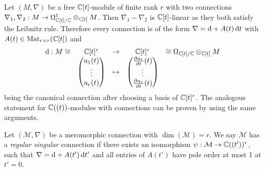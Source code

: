\begin{rem}
    Let $(M, \nabla)$ be a free $\mathbb{C}[t]$-module of finite rank $r$ with two connections $\nabla_1, \nabla_2: M \to \Omega_{\mathbb{C}[t]/\mathbb{C}}^1 \otimes_{\mathbb{C}[t]} M$. Then $\nabla_1 - \nabla_2$ is $\mathbb{C}[t]$-linear as they both satisfy the Leibnitz rule. Therefore every connection is of the form $\nabla = \mathop{}\!\mathrm{d} + A(t)\mathop{}\!\mathrm{d}{t}$ with $A(t) \in \operatorname{Mat}_{r\times r}(\mathbb{C}[t])$ and 
    \[
    \begin{matrix}
    \mathop{}\!\mathrm{d}{}: M \cong & \mathbb{C}[t]^r & \to & \mathbb{C}[t]^r &\cong \Omega_{\mathbb{C}[t]/\mathbb{C}} \otimes_{\mathbb{C}[t]} M \\
            & \begin{pmatrix} u_1(t) \\ \vdots \\ u_r(t) \end{pmatrix} & \mapsto  & \begin{pmatrix} \frac{\partial u_1}{\partial t}(t) \\ \vdots \\ \frac{\partial u_r}{\partial t}(t) \end{pmatrix} &
\end{matrix}
    \]
    being the canonical connection after choosing a basis of $\mathbb{C}[t]^r$. The analogous statement for $\mathbb{C}((t))$-modules with connections can be proven by using the same arguments.
\end{rem}


\begin{defi}
    Let $(\mathcal{M}, \nabla)$ be a meromorphic connection with $\dim (\mathcal{M}) = r$. We say $\mathcal{M}$ has a \emph{regular singular} connection if there exists an isomorphism $\psi: \mathcal{M} \to \mathbb{C}((t'))^r$, such that $\nabla = \mathop{}\!\mathrm{d} + A(t')\mathop{}\!\mathrm{d} t'$ and all entries of $A(t')$ have pole order at most 1 at $t'=0$. 
\end{defi}


